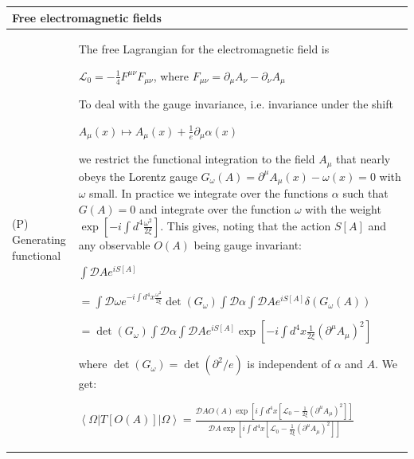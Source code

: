 \documentclass[11pt,amsmath,amssymb,latexsym]{article}
\newcommand{\toshTableBegin} 			{\begin{tabular}{|p{5cm}|p{11cm}|}}
\newcommand{\toshTableEnd} 				{\hline \end{tabular}}
\newcommand{\toshTableTitle}[1] 	{\hline \multicolumn{2}{|l|}{{\bf{#1}}}\\ \hline}
\newcommand{\toshProperty}[2]			{\hline (P) {#1} & {#2} \\}
\newcommand{\toshD}							{{\mathcal{D}}}
\newcommand{\toshL}							{{\mathcal{L}}}
\newcommand{\bra}[1]{\left<{#1}\right|}
\newcommand{\ket}[1]{\left|{#1}\right>}
\begin{document}
\toshTableBegin
\toshTableTitle{Free electromagnetic fields}
\toshProperty{Generating functional}{The free Lagrangian for the electromagnetic field is

\quad $\toshL_0 = -\frac{1}{4}F^{\mu\nu}F_{\mu\nu}$, where $F_{\mu\nu} = \partial_\mu A_\nu - \partial_\nu A_\mu$

To deal with the gauge invariance, i.e. invariance under the shift 

\quad $A_\mu(x) \mapsto A_\mu(x) + \frac{1}{e}\partial_\mu \alpha(x)$

we restrict the functional integration to the field $A_\mu$ that nearly obeys the Lorentz gauge $G_\omega(A) = \partial^\mu A_\mu (x) - \omega(x) = 0$ with $\omega$ small. In practice we integrate over the functions $\alpha$ such that $G(A)=0$ and integrate over the function $\omega$ with the weight $\exp\left[-i\int d^4 \frac{\omega^2}{2\xi}\right]$. This gives, noting that the action $S[A]$ and any observable $O(A)$ being gauge invariant:

\quad $\displaystyle\int \toshD A e^{iS[A]}$

\quad $\displaystyle = \int\toshD\omega e^{-i\int d^4 x \frac{\omega^2}{2\xi}} \det(G_\omega)\int\toshD\alpha \int\toshD A e^{iS[A]} \delta(G_\omega(A))$

\quad $= \det(G_\omega)\int\toshD\alpha \int\toshD A e^{iS[A]} \exp\left[-i\int d^4 x\frac{1}{2\xi}(\partial^\mu A_\mu)^2\right]$

where $\det(G_\omega) = \det(\partial^2/e)$ is independent of $\alpha$ and $A$. We get:

\quad $\displaystyle\bra{\Omega} T[O(A)]\ket{\Omega} = \frac{\displaystyle \toshD A O(A) \exp\left[ i\int d^4 x [\toshL_0 - \frac{1}{2\xi}(\partial^\mu A_\mu)^2]\right]}{\displaystyle \toshD A \exp\left[ i\int d^4 x [\toshL_0 - \frac{1}{2\xi}(\partial^\mu A_\mu)^2]\right]}$

}
\toshTableEnd
\bigskip

\end{document}
